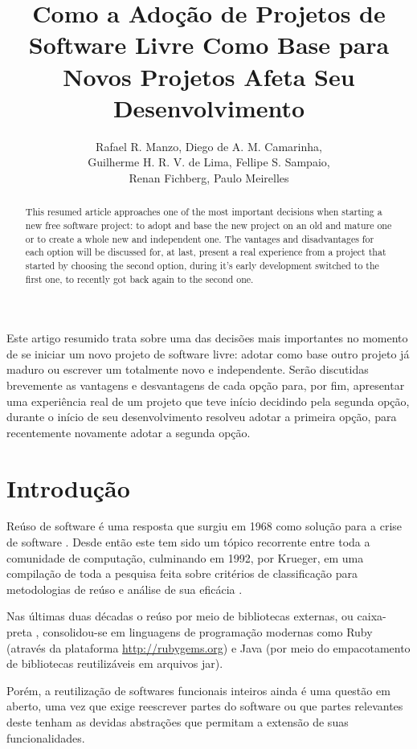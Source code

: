 \documentclass[12pt]{article}
\title{Como a Adoção de Projetos de Software Livre Como Base para Novos Projetos Afeta Seu Desenvolvimento}
\author{Rafael R. Manzo\inst{1}, Diego de A. M. Camarinha\inst{1},\\
        Guilherme H. R. V. de Lima\inst{1}, Fellipe S. Sampaio\inst{1},\\
        Renan Fichberg\inst{1}, Paulo Meirelles\inst{2}}
\begin{document}
\maketitle

\begin{abstract}
  This resumed article approaches one of the most important decisions when starting a new free software project: to adopt and base the new project on an old and mature one or to create a whole new and independent one. The vantages and disadvantages for each option will be discussed for, at last, present a real experience from a project that started by choosing the second option, during it's early development switched to the first one, to recently got back again to the second one.
\end{abstract}

\begin{resumo}
  Este artigo resumido trata sobre uma das decisões mais importantes no momento de se iniciar um novo projeto de software livre: adotar como base outro projeto já maduro ou escrever um totalmente novo e independente. Serão discutidas brevemente as vantagens e desvantagens de cada opção para, por fim, apresentar uma experiência real de um projeto que teve início decidindo pela segunda opção, durante o início de seu desenvolvimento resolveu adotar a primeira opção, para recentemente novamente adotar a segunda opção.
\end{resumo}


\section{Introdução} \label{sec:introducao}
Reúso de software é uma resposta que surgiu em 1968 como solução para a crise de software \cite{nr68}. Desde então este tem sido um tópico recorrente entre toda a comunidade de computação, culminando em 1992, por Krueger, em uma compilação de toda a pesquisa feita sobre critérios de classificação para metodologias de reúso e análise de sua eficácia \cite{k92}.

Nas últimas duas décadas o reúso por meio de bibliotecas externas, ou caixa-preta \cite{hdghi11}, consolidou-se em linguagens de programação modernas como Ruby (através da plataforma \url{http://rubygems.org}) e Java (por meio do empacotamento de bibliotecas reutilizáveis em arquivos jar).

Porém, a reutilização de softwares funcionais inteiros ainda é uma questão em aberto, uma vez que exige reescrever partes do software ou que partes relevantes deste tenham as devidas abstrações que permitam a extensão de suas funcionalidades.
\end{document}
